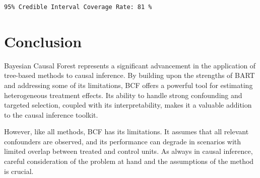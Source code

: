 \documentclass[
  letterpaper,
  DIV=11,
  numbers=noendperiod]{scrreprt}
\newenvironment{Shaded}{\begin{snugshade}}{\end{snugshade}}
\newcommand{\DecValTok}[1]{\textcolor[rgb]{0.68,0.00,0.00}{#1}}
\newcommand{\FloatTok}[1]{\textcolor[rgb]{0.68,0.00,0.00}{#1}}
\newcommand{\FunctionTok}[1]{\textcolor[rgb]{0.28,0.35,0.67}{#1}}
\newcommand{\NormalTok}[1]{\textcolor[rgb]{0.00,0.23,0.31}{#1}}
\newcommand{\OtherTok}[1]{\textcolor[rgb]{0.00,0.23,0.31}{#1}}
\newcommand{\SpecialCharTok}[1]{\textcolor[rgb]{0.37,0.37,0.37}{#1}}
\newcommand{\StringTok}[1]{\textcolor[rgb]{0.13,0.47,0.30}{#1}}
\begin{document}
\begin{Shaded}
\end{Shaded}

\begin{verbatim}
95% Credible Interval Coverage Rate: 81 %
\end{verbatim}

\section{Conclusion}\label{conclusion-4}

Bayesian Causal Forest represents a significant advancement in the
application of tree-based methods to causal inference. By building upon
the strengths of BART and addressing some of its limitations, BCF offers
a powerful tool for estimating heterogeneous treatment effects. Its
ability to handle strong confounding and targeted selection, coupled
with its interpretability, makes it a valuable addition to the causal
inference toolkit.

However, like all methods, BCF has its limitations. It assumes that all
relevant confounders are observed, and its performance can degrade in
scenarios with limited overlap between treated and control units. As
always in causal inference, careful consideration of the problem at hand
and the assumptions of the method is crucial.
\end{document}
